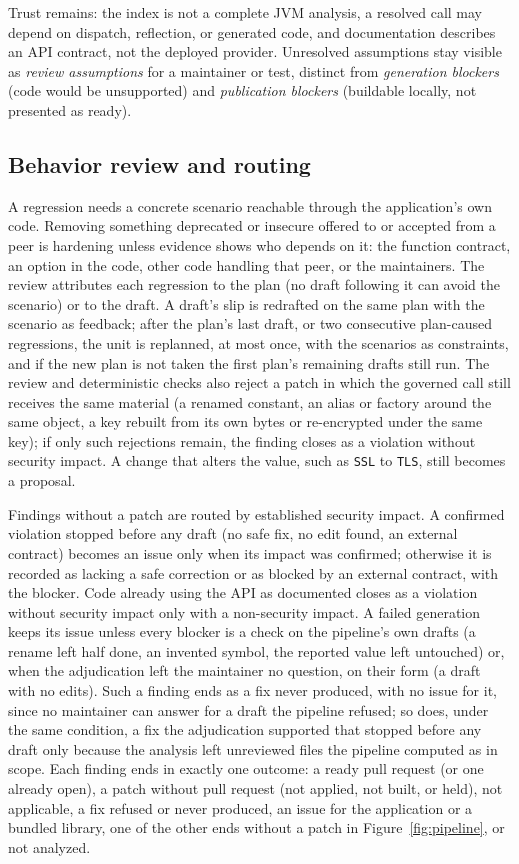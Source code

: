 \documentclass[conference]{IEEEtran}
\begin{document}
Trust remains: the index is not a complete JVM analysis, a resolved call may
depend on dispatch, reflection, or generated code, and documentation describes
an API contract, not the deployed provider. Unresolved assumptions stay
visible as \emph{review assumptions} for a maintainer or test, distinct from
\emph{generation blockers} (code would be unsupported) and \emph{publication
blockers} (buildable locally, not presented as ready).

\subsection{Behavior review and routing}

A regression needs a concrete scenario reachable through the application's own
code. Removing something deprecated or insecure offered to or accepted from a
peer is hardening unless evidence shows who depends on it: the function
contract, an option in the code, other code handling that peer, or the
maintainers. The review attributes each regression to the plan (no draft
following it can avoid the scenario) or to the draft. A draft's slip is
redrafted on the same plan with the scenario as feedback; after the plan's last
draft, or two consecutive plan-caused regressions, the unit is replanned, at
most once, with the scenarios as constraints, and if the new plan is not taken
the first plan's remaining drafts still run. The review and
deterministic checks also reject a patch in which the governed call still
receives the same material (a renamed constant, an
alias or factory around the same object, a key rebuilt from its own bytes or
re-encrypted under the same key); if only such rejections remain, the finding
closes as a violation without security impact. A change that alters the value,
such as \texttt{SSL} to \texttt{TLS}, still becomes a proposal.

Findings without a patch are routed by established security impact. A
confirmed violation stopped before any draft (no safe fix, no edit found, an
external contract) becomes an issue only when its impact was confirmed;
otherwise it is recorded as lacking a safe correction or as blocked by an
external contract, with the blocker. Code already using the API as documented
closes as a violation without security impact only with a non-security impact.
A failed generation keeps its issue unless every blocker is a check on the
pipeline's own drafts (a rename left half done, an invented symbol, the
reported value left untouched) or, when the adjudication left the maintainer no
question, on their form (a draft with no edits). Such a finding ends as a fix
never produced, with no issue for it, since no maintainer can answer for a
draft the pipeline refused; so does, under the same condition, a fix the
adjudication supported that stopped before any draft only because the analysis
left unreviewed files the pipeline computed as in scope. Each finding ends in
exactly one outcome: a ready pull request (or one already open), a patch
without pull request (not applied, not built, or held), not applicable, a fix
refused or never produced, an issue for the application or a bundled library,
one of the other ends without a patch in Figure~\ref{fig:pipeline}, or not
analyzed.
\end{document}
